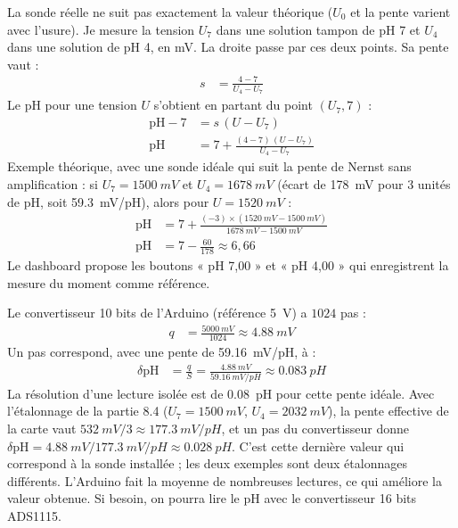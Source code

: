 \begin{demonstration}
La sonde réelle ne suit pas exactement la valeur théorique ($U_0$ et la pente varient avec l'usure). Je mesure la tension $U_7$ dans une solution tampon de pH 7 et $U_4$ dans une solution de pH 4, en mV. La droite passe par ces deux points. Sa pente vaut :
\begin{align*}
s &= \frac{4 - 7}{U_4 - U_7}
\end{align*}
Le pH pour une tension $U$ s'obtient en partant du point $(U_7, 7)$ :
\begin{align*}
\mathrm{pH} - 7 &= s\,(U - U_7)\\
\mathrm{pH} &= 7 + \frac{(4 - 7)\,(U - U_7)}{U_4 - U_7}
\end{align*}
Exemple théorique, avec une sonde idéale qui suit la pente de Nernst sans amplification : si $U_7 = \qty{1500}{mV}$ et $U_4 = \qty{1678}{mV}$ (écart de \qty{178}{mV} pour 3 unités de pH, soit \qty{59,3}{mV/pH}), alors pour $U = \qty{1520}{mV}$ :
\begin{align*}
\mathrm{pH} &= 7 + \frac{(-3) \times (\qty{1520}{mV} - \qty{1500}{mV})}{\qty{1678}{mV} - \qty{1500}{mV}}\\
\mathrm{pH} &= 7 - \frac{60}{178} \approx 6{,}66
\end{align*}
Le dashboard propose les boutons « pH 7,00 » et « pH 4,00 » qui enregistrent la mesure du moment comme référence.
\end{demonstration}

\begin{demonstration}
Le convertisseur 10 bits de l'Arduino (référence \qty{5}{V}) a $1024$ pas :
\begin{align*}
q &= \frac{\qty{5000}{mV}}{1024} \approx \qty{4,88}{mV}
\end{align*}
Un pas correspond, avec une pente de \qty{59,16}{mV/pH}, à :
\begin{align*}
\delta\mathrm{pH} &= \frac{q}{S} = \frac{\qty{4,88}{mV}}{\qty{59,16}{mV/pH}} \approx \qty{0,083}{pH}
\end{align*}
La résolution d'une lecture isolée est de \qty{0,08}{pH} pour cette pente idéale. Avec l'étalonnage de la partie 8.4 ($U_7 = \qty{1500}{mV}$, $U_4 = \qty{2032}{mV}$), la pente effective de la carte vaut $\qty{532}{mV}/3 \approx \qty{177,3}{mV/pH}$, et un pas du convertisseur donne $\delta\mathrm{pH} = \qty{4,88}{mV}/\qty{177,3}{mV/pH} \approx \qty{0,028}{pH}$. C'est cette dernière valeur qui correspond à la sonde installée ; les deux exemples sont deux étalonnages différents. L'Arduino fait la moyenne de nombreuses lectures, ce qui améliore la valeur obtenue. Si besoin, on pourra lire le pH avec le convertisseur 16 bits ADS1115.
\end{demonstration}

